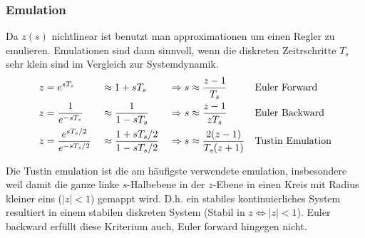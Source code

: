     \subsubsection{Emulation}
        Da $z(s)$ nichtlinear ist benutzt man approximationen um einen Regler zu emulieren. Emulationen sind dann sinnvoll, wenn die diskreten Zeitrschritte $T_s$ sehr klein sind im Vergleich zur Systemdynamik.
        \begin{align*}
            z &= e^{sT_s}    &   &\approx 1+sT_s    &   &\Rightarrow s\approx \frac{z-1}{T_s} &   &\textnormal{Euler Forward}\\
            z &= \frac{1}{e^{-sT_s}}    &   &\approx \frac{1}{1-sT_s}    &   &\Rightarrow s\approx \frac{z-1}{zT_s}  &   &\textnormal{Euler Backward}\\
            z &= \frac{e^{sT_s/2}}{e^{-sT_s/2}}    &   &\approx \frac{1+sT_s/2}{1-sT_s/2}    &   &\Rightarrow s\approx \frac{2(z-1)}{T_s(z+1)}  &   &\textnormal{Tustin Emulation}\\
        \end{align*}
        
        Die Tustin emulation ist die am häufigste verwendete emulation, insbesondere weil damit die ganze linke $s$-Halbebene in der $z$-Ebene in einen Kreis mit Radius kleiner eins ($|z|<1$) gemappt wird. D.h. ein stabiles kontinuierliches System resultiert in einem stabilen diskreten System (Stabil in $z \Leftrightarrow |z|<1$). Euler backward erfüllt diese Kriterium auch, Euler forward hingegen nicht. 
        

    
    